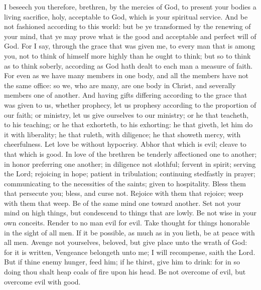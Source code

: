 I beseech you therefore, brethren, by the mercies of God, to present your bodies a living sacrifice, holy, acceptable to God, which is your spiritual service. And be not fashioned according to this world: but be ye transformed by the renewing of your mind, that ye may prove what is the good and acceptable and perfect will of God.  For I say, through the grace that was given me, to every man that is among you, not to think of himself more highly than he ought to think; but so to think as to think soberly, according as God hath dealt to each man a measure of faith. For even as we have many members in one body, and all the members have not the same office: so we, who are many, are one body in Christ, and severally members one of another. And having gifts differing according to the grace that was given to us, whether prophecy, let us prophesy according to the proportion of our faith; or ministry, let us give ourselves to our ministry; or he that teacheth, to his teaching; or he that exhorteth, to his exhorting: he that giveth, let him do it with liberality; he that ruleth, with diligence; he that showeth mercy, with cheerfulness.  Let love be without hypocrisy. Abhor that which is evil; cleave to that which is good. In love of the brethren be tenderly affectioned one to another; in honor preferring one another; in diligence not slothful; fervent in spirit; serving the Lord; rejoicing in hope; patient in tribulation; continuing stedfastly in prayer; communicating to the necessities of the saints; given to hospitality. Bless them that persecute you; bless, and curse not. Rejoice with them that rejoice; weep with them that weep. Be of the same mind one toward another. Set not your mind on high things, but condescend to things that are lowly. Be not wise in your own conceits. Render to no man evil for evil. Take thought for things honorable in the sight of all men. If it be possible, as much as in you lieth, be at peace with all men. Avenge not yourselves, beloved, but give place unto the wrath of God: for it is written, Vengeance belongeth unto me; I will recompense, saith the Lord. But if thine enemy hunger, feed him; if he thirst, give him to drink: for in so doing thou shalt heap coals of fire upon his head. Be not overcome of evil, but overcome evil with good. 

